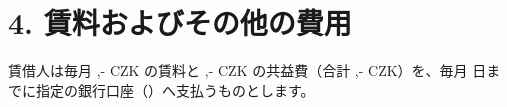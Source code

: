 \section*{4. 賃料およびその他の費用}
賃借人は毎月 \Rentrentamount,- CZK の賃料と \Rentservicesamount,- CZK の共益費（合計 \Renttotalamount,- CZK）を、毎月 \Rentpaymentday 日までに指定の銀行口座（\Rentbankaccount）へ支払うものとします。
